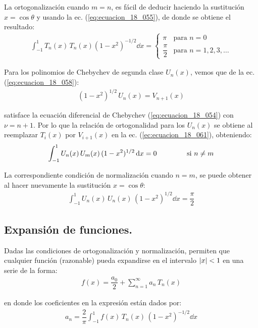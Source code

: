 La ortogonalización cuando $m = n$, es fácil de deducir haciendo la sustitución $x = \cos \theta$ y usando la ec. (\ref{eq:ecuacion_18_055}), de donde se obtiene el resultado:
\begin{align}
\int_{-1}^{1} T_{n} (x) \, T_{n} (x) (1 - x^{2})^{-1/2} \dd{x} = \begin{cases}
\pi & \mbox{para  } n = 0 \\[0.5em]
\dfrac{\pi}{2} & \mbox{para  } n = 1, 2, 3, \ldots
\end{cases}
\label{eq:ecuacion_18_062}
\end{align}

Para los polinomios de Chebychev de segunda clase $U_{n}(x)$, vemos que de la ec. (\ref{eq:ecuacion_18_058}):
\begin{align*}
(1 - x^{2})^{1/2} \, U_{n} (x) = V_{n+1} (x)
\end{align*}

satisface la ecuación diferencial de Chebychev (\ref{eq:ecuacion_18_054}) con $\nu = n + 1$. Por lo que la relación de ortogonalidad para los $U_{n}(x)$ se obtiene al reemplazar $T_{i}(x)$ por $V_{i+1} (x)$ en la ec. (\ref{ec:ecuacion_18_061}), obteniendo:
\begin{align*}
\int_{-1}^{1} U_{n}(x) \, U_{m}(x) \, (1 - x^{2})^{1/2} \dd{x} = 0 \hspace{1.5cm} \mbox{si  } n \neq m
\end{align*}

La correspondiente condición de normalización cuando $n = m$, se puede obtener al hacer nuevamente la sustitución $x  = \cos \theta$:
\begin{align*}
\int_{-1}^{1} U_{n}(x) \, U_{n}(x) \, (1 - x^{2})^{1/2} \dd{x} = \dfrac{\pi}{2}
\end{align*}

\subsection{Expansión de funciones.}

Dadas las condiciones de ortogonalización y normalización, permiten que cualquier función (razonable) pueda expandirse en el intervalo $\abs{x} < 1$ en una serie de la forma:
\begin{align*}
f(x) = \dfrac{a_{0}}{2} + \sum_{n=1}^{\infty} a_{n} \, T_{n} (x)
\end{align*}

en donde los coeficientes en la expresión están dados por:
\begin{align*}
a_{n} = \dfrac{2}{\pi} \int_{-1}^{1} f(x) \, T_{n} (x) \, (1 - x^{2})^{-1/2} \dd{x}
\end{align*}

